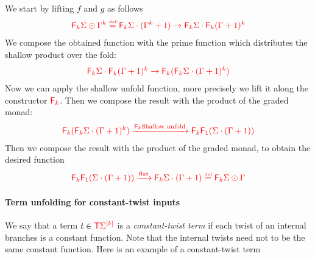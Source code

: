 We start by lifting $f$ and $g$ as follows
\begin{align*}
{\color{red}{{\color{red}{\mathsf F_{k}}}\Sigma \odot \Gamma^k\overset{\text{{\tiny def}}}{=} {\color{red}{\mathsf F_{k}}}\Sigma \cdot (\Gamma^k+1) \to  {\color{red}{\mathsf F_{k}}}\Sigma \cdot {\color{red}{\mathsf F_{k}}}(\Gamma+1)^k}}
\end{align*}
We compose the obtained function with the prime function which distributes   the shallow product over the fold:
\begin{align*}
{\color{red}{{\color{red}{\mathsf F_{k}}}\Sigma \cdot {\color{red}{\mathsf F_{k}}}(\Gamma+1)^k \to {\color{red}{\mathsf F_{k}}}({\color{red}{\mathsf F_{k}}}\Sigma \cdot (\Gamma+1)^k)}}
\end{align*}
Now we can apply the shallow unfold function, more precisely we lift it along the constructor $\reduce k$. Then we compose the result with the product of the graded monad:
\begin{align*}
{\color{red}{{\color{red}{\mathsf F_{k}}}({\color{red}{\mathsf F_{k}}}\Sigma \cdot (\Gamma+1)^k) \xrightarrow{{\color{red}{\mathsf F_{k}}}\text{Shallow unfold}} {\color{red}{\mathsf F_{k}}}{\color{red}{\mathsf F_{1}}}( \Sigma \cdot (\Gamma+1)) }}
\end{align*}
Then we compose the result with the product of the graded monad, to obtain the desired function
\begin{align*}
{\color{red}{{\color{red}{\mathsf F_{k}}}{\color{red}{\mathsf F_{1}}}(\Sigma \cdot (\Gamma+1)) \xrightarrow{{\color{red}{\mathrm{flat}}}} {\color{red}{\mathsf F_{k}}}\Sigma \cdot (\Gamma+1) \overset{\text{{\tiny def}}}{=} {\color{red}{\mathsf F_{k}}}\Sigma \odot \Gamma}}
\end{align*}

\paragraph*{Term unfolding for constant-twist inputs}

We say that a term $ t \in {\color{red}{\mathsf T}} {\color{red}{\Sigma}}^{{\color{red}{[k]}}}$ is a \emph{constant-twist term}  if each twist of an internal branches is a constant function. Note that the internal twists need not to be the same constant function. Here is an example of a constant-twist term

